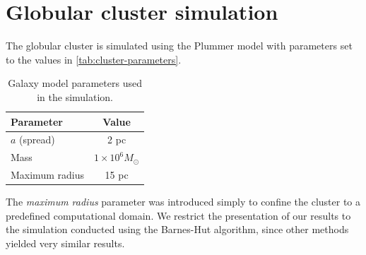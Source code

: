 \section{Globular cluster simulation}
The globular cluster is simulated using the Plummer model with parameters set to the values in \autoref{tab:cluster-parameters}.
\begin{table}[htp]
    \centering
    \begin{tabular}{|l|c|}
        \hline
        \textbf{Parameter} & \textbf{Value}          \\
        \hline
        $a$ (spread)       & 2 pc                    \\
        Mass               & $1 \times 10^6 M_\odot$ \\
        Maximum radius     & 15 pc                   \\
        \hline
    \end{tabular}
    \caption{Galaxy model parameters used in the simulation.}
    \label{tab:cluster-parameters}
\end{table}
The \textit{maximum radius} parameter was introduced simply to confine the cluster to a predefined computational domain.
We restrict the presentation of our results to the simulation conducted using the Barnes-Hut algorithm, since other methods yielded very similar results.


